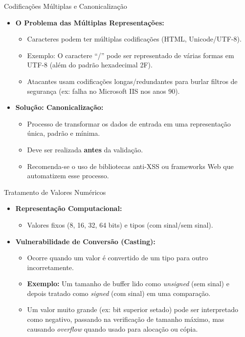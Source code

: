 \begin{frame}{Codificações Múltiplas e Canonicalização}
    \begin{itemize}
        \item \textbf{O Problema das Múltiplas Representações:}
              \begin{itemize}
                  \item Caracteres podem ter múltiplas codificações (HTML, Unicode/UTF-8).
                  \item Exemplo: O caractere ``/'' pode ser representado de várias formas em UTF-8 (além do padrão hexadecimal 2F).
                  \item Atacantes usam codificações longas/redundantes para burlar filtros de segurança (ex: falha no Microsoft IIS nos anos 90).
              \end{itemize}

        \item \textbf{Solução: Canonicalização:}
              \begin{itemize}
                  \item Processo de transformar os dados de entrada em uma representação única, padrão e mínima.
                  \item Deve ser realizada \textbf{antes} da validação.
                  \item Recomenda-se o uso de bibliotecas anti-XSS ou frameworks Web que automatizem esse processo.
              \end{itemize}
    \end{itemize}
\end{frame}

\begin{frame}{Tratamento de Valores Numéricos}
    \begin{itemize}
        \item \textbf{Representação Computacional:}
              \begin{itemize}
                  \item Valores fixos (8, 16, 32, 64 bits) e tipos (com sinal/sem sinal).
              \end{itemize}

        \item \textbf{Vulnerabilidade de Conversão (Casting):}
              \begin{itemize}
                  \item Ocorre quando um valor é convertido de um tipo para outro incorretamente.
                  \item \textbf{Exemplo:} Um tamanho de buffer lido como \textit{unsigned} (sem sinal) e depois tratado como \textit{signed} (com sinal) em uma comparação.
                  \item Um valor muito grande (ex: bit superior setado) pode ser interpretado como negativo, passando na verificação de tamanho máximo, mas causando \textit{overflow} quando usado para alocação ou cópia.
              \end{itemize}
    \end{itemize}
\end{frame}

